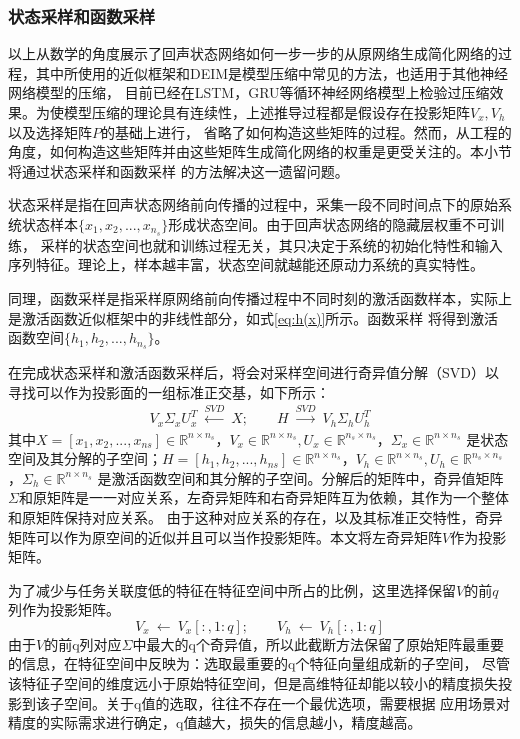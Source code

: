 \subsubsection{状态采样和函数采样}
以上从数学的角度展示了回声状态网络如何一步一步的从原网络生成简化网络的过程，其中所使用的近似框架和DEIM是模型压缩中常见的方法，也适用于其他神经网络模型的压缩，
目前已经在LSTM，GRU等循环神经网络模型上检验过压缩效果。为使模型压缩的理论具有连续性，上述推导过程都是假设存在投影矩阵\(V_x,V_h\)以及选择矩阵\(P\)的基础上进行，
省略了如何构造这些矩阵的过程。然而，从工程的角度，如何构造这些矩阵并由这些矩阵生成简化网络的权重是更受关注的。本小节将通过状态采样和函数采样
的方法解决这一遗留问题。

状态采样是指在回声状态网络前向传播的过程中，采集一段不同时间点下的原始系统状态样本\(\{x_1,x_2,...,x_{n_s}\}\)形成状态空间。由于回声状态网络的隐藏层权重不可训练，
采样的状态空间也就和训练过程无关，其只决定于系统的初始化特性和输入序列特征。理论上，样本越丰富，状态空间就越能还原动力系统的真实特性。

同理，函数采样是指采样原网络前向传播过程中不同时刻的激活函数样本，实际上是激活函数近似框架中的非线性部分，如式\ref{eq:h(x)}所示。函数采样
将得到激活函数空间\(\{h_1,h_2,...,h_{n_s}\}\)。

在完成状态采样和激活函数采样后，将会对采样空间进行奇异值分解（SVD）以寻找可以作为投影面的一组标准正交基，如下所示：
\begin{equation}
	\begin{split}
		V_x \Sigma_x U_x^T \ \xleftarrow{SVD} \ X;	\qquad	H \ \xrightarrow{SVD} \ V_h \Sigma_h U_h^T 	
	\end{split}
\end{equation}
其中\(X = [x_1,x_2,...,x_{ns}] \in \mathbb{R}^{n \times n_s} \)，\(V_x \in \mathbb{R}^{n \times n_s},U_x \in \mathbb{R}^{n_s \times n_s}\)，\(\Sigma_x \in \mathbb{R}^{n \times n_s}\)
是状态空间及其分解的子空间；\(H = [h_1,h_2,...,h_{ns}] \in \mathbb{R}^{n \times n_s} \)，\(V_h \in \mathbb{R}^{n \times n_s},U_h \in \mathbb{R}^{n_s \times n_s}\)，\(\Sigma_h \in \mathbb{R}^{n \times n_s}\)
是激活函数空间和其分解的子空间。分解后的矩阵中，奇异值矩阵\(\Sigma\)和原矩阵是一一对应关系，左奇异矩阵和右奇异矩阵互为依赖，其作为一个整体和原矩阵保持对应关系。
由于这种对应关系的存在，以及其标准正交特性，奇异矩阵可以作为原空间的近似并且可以当作投影矩阵。本文将左奇异矩阵\(V\)作为投影矩阵。

为了减少与任务关联度低的特征在特征空间中所占的比例，这里选择保留\(V\)的前\(q\)列作为投影矩阵。
\begin{equation}
	V_x \ \leftarrow \ V_x[:,1:q];	\qquad V_h \ \leftarrow \ V_h[:,1:q]
\end{equation}
由于\(V\)的前q列对应\(\Sigma\)中最大的q个奇异值，所以此截断方法保留了原始矩阵最重要的信息，在特征空间中反映为：选取最重要的q个特征向量组成新的子空间，
尽管该特征子空间的维度远小于原始特征空间，但是高维特征却能以较小的精度损失投影到该子空间。关于q值的选取，往往不存在一个最优选项，需要根据
应用场景对精度的实际需求进行确定，q值越大，损失的信息越小，精度越高。

